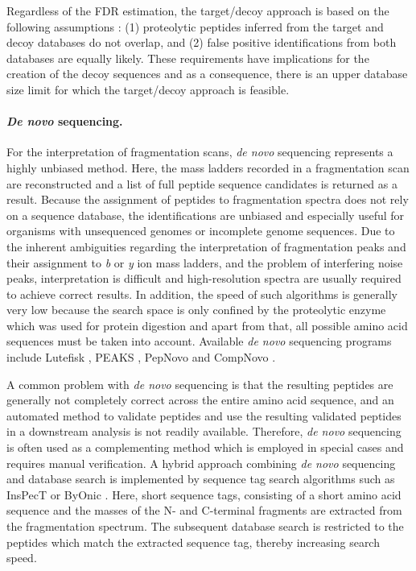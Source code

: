 Regardless of the FDR estimation, the target/decoy approach is based on 
the following assumptions \citep{Elias2007}: (1) proteolytic peptides inferred 
from the target and decoy databases do not overlap, and (2) false positive 
identifications from both databases are equally likely.
These requirements have implications for the creation of the decoy sequences
and as a consequence, there is an upper database size limit for which the 
target/decoy approach is feasible.

\paragraph{{\em De novo} sequencing.}

For the interpretation of fragmentation scans, {\em de novo} sequencing 
represents a highly unbiased method.
Here, the mass ladders recorded in a fragmentation scan are reconstructed
and a list of full peptide sequence candidates is returned as a result.
Because the assignment of peptides to fragmentation spectra does not rely
on a sequence database, the identifications are unbiased and especially
useful for organisms with unsequenced genomes or incomplete genome sequences.
Due to the inherent ambiguities regarding the interpretation of fragmentation
peaks and their assignment to {\em b} or {\em y} ion mass ladders, and the 
problem of interfering noise peaks, interpretation is difficult and 
high-resolution spectra are usually required to achieve correct results.
In addition, the speed of such algorithms is generally very low because the
search space is only confined by the proteolytic enzyme which was used
for protein digestion and apart from that, all possible amino acid sequences
must be taken into account.
Available {\em de novo} sequencing programs include Lutefisk 
\citep{Johnson2002}, PEAKS \citep{Ma2003}, PepNovo \citep{Frank2005}
and CompNovo \citep{Bertsch2009}.

A common problem with {\em de novo} sequencing is that the resulting peptides
are generally not completely correct across the entire amino acid sequence, 
and an automated method to validate peptides and use the resulting validated 
peptides in a downstream analysis is not readily available. 
Therefore, {\em de novo} sequencing is often used as a complementing method 
which is employed in special cases and requires manual verification.
A hybrid approach combining {\em de novo} sequencing and database search
is implemented by sequence tag search algorithms such as InsPecT 
\citep{Tanner2005} or ByOnic \citep{Bern2007}.
Here, short sequence tags, consisting of a short amino acid sequence and the
masses of the N- and C-terminal fragments are extracted from the fragmentation 
spectrum.
The subsequent database search is restricted to the peptides which match
the extracted sequence tag, thereby increasing search speed.


